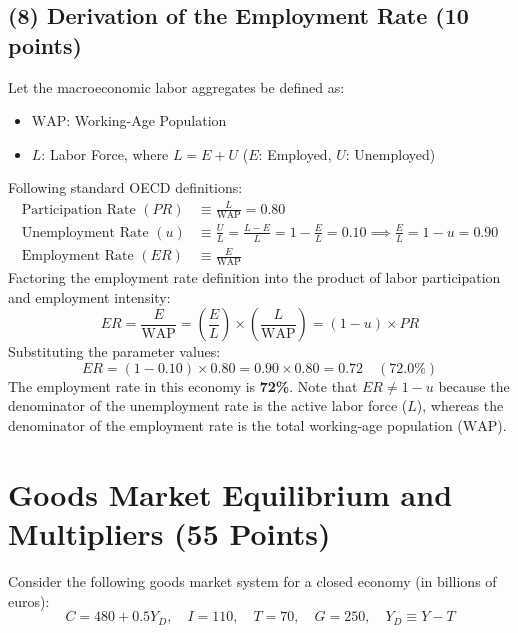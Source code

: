 \documentclass[11pt,a4paper]{article}
\begin{document}
\subsection*{(8) Derivation of the Employment Rate (10 points)}
Let the macroeconomic labor aggregates be defined as:
\begin{itemize}
    \item $\text{WAP}$: Working-Age Population
    \item $L$: Labor Force, where $L = E + U$ ($E$: Employed, $U$: Unemployed)
\end{itemize}
Following standard OECD definitions:
\begin{align}
    \text{Participation Rate } (PR) &\equiv \frac{L}{\text{WAP}} = 0.80 \\
    \text{Unemployment Rate } (u) &\equiv \frac{U}{L} = \frac{L - E}{L} = 1 - \frac{E}{L} = 0.10 \implies \frac{E}{L} = 1 - u = 0.90 \\
    \text{Employment Rate } (ER) &\equiv \frac{E}{\text{WAP}}
\end{align}
Factoring the employment rate definition into the product of labor participation and employment intensity:
\begin{equation}
    ER = \frac{E}{\text{WAP}} = \left( \frac{E}{L} \right) \times \left( \frac{L}{\text{WAP}} \right) = (1 - u) \times PR
\end{equation}
Substituting the parameter values:
\begin{equation}
    ER = (1 - 0.10) \times 0.80 = 0.90 \times 0.80 = \mathbf{0.72} \quad (\mathbf{72.0\%})
\end{equation}
The employment rate in this economy is \textbf{72\%}. Note that $ER \neq 1 - u$ because the denominator of the unemployment rate is the active labor force ($L$), whereas the denominator of the employment rate is the total working-age population ($\text{WAP}$).

\section{Goods Market Equilibrium and Multipliers (55 Points)}

Consider the following goods market system for a closed economy (in billions of euros):
\begin{equation}
    C = 480 + 0.5 Y_D, \quad I = 110, \quad T = 70, \quad G = 250, \quad Y_D \equiv Y - T
\end{equation}
\end{document}
